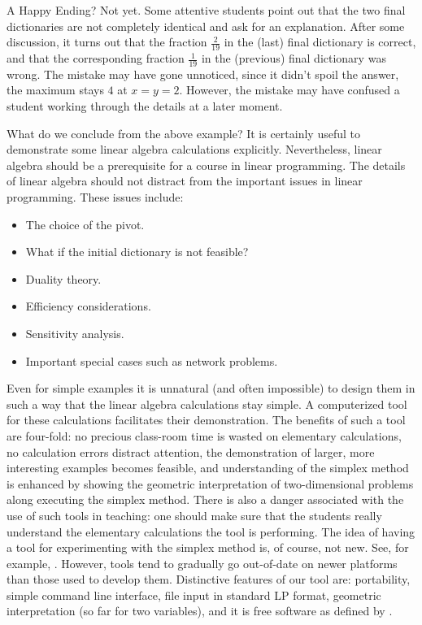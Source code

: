 \documentclass[ukenglish]{nik}
\begin{document}
A Happy Ending? Not yet. Some attentive students point out that the two final dictionaries
are not completely identical and ask for an explanation. After some discussion, it turns
out that the fraction $\frac{2}{19}$ in the (last) final dictionary is correct,
and that the corresponding fraction $\frac{1}{19}$ in the (previous) final dictionary was wrong.
The mistake may have gone unnoticed, since it didn't spoil the answer, the maximum stays
$4$ at $x=y=2$. However, the mistake may have confused a student working through the details at a later moment.

What do we conclude from the above example? It is certainly useful to demonstrate some
linear algebra calculations explicitly. Nevertheless, linear algebra should be a prerequisite for a course
in linear programming. The details of linear algebra should not distract from the important
issues in linear programming. These issues include:
\begin{itemize}
\item The choice of the pivot.
\item What if the initial dictionary is not feasible?
\item Duality theory.
\item Efficiency considerations.
\item Sensitivity analysis.
\item Important special cases such as network problems.
\end{itemize}
Even for simple examples it is unnatural (and often impossible)
to design them in such a way that the linear algebra calculations stay simple.
A computerized tool for these calculations facilitates their demonstration.
The benefits of such a tool are four-fold: no precious class-room time is wasted
on elementary calculations, no calculation errors distract attention,
the demonstration of larger, more interesting examples becomes feasible, and 
understanding of the simplex method is enhanced by showing the geometric interpretation of two-dimensional problems along executing the simplex method.
There is also a danger associated with the use of such tools in teaching: 
one should make sure that the students really understand the elementary
calculations the tool is performing. The idea of having a tool
for experimenting with the simplex method is, of course, not new. 
See, for example, \cite{SimplexPivotTool, AdvancedPivotTool}.
However, tools tend to gradually go out-of-date on newer platforms
than those used to develop them. Distinctive features of our tool are: 
portability, 
simple command line interface, 
file input in standard LP format,
geometric interpretation (so far for two variables), and it is free software as defined by \cite{freesw}.
\end{document}

